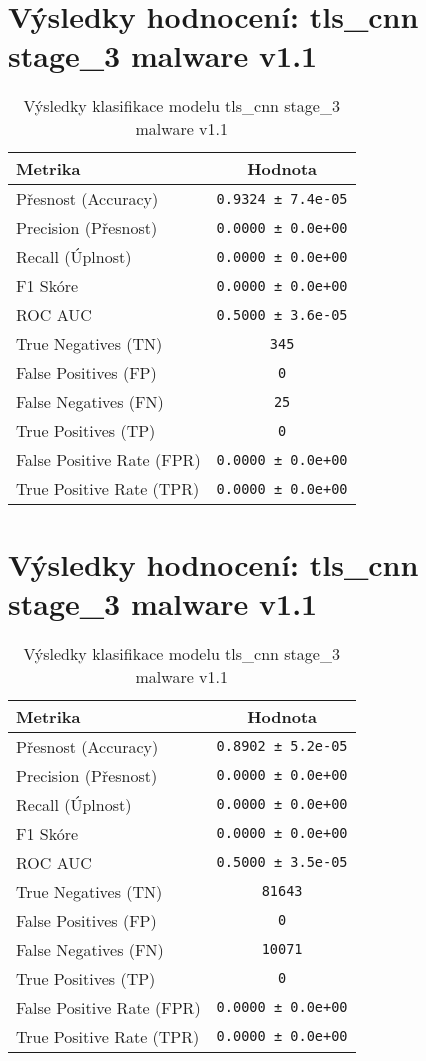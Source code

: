 \section*{Výsledky hodnocení: tls_cnn stage_3 malware v1.1}
\begin{table}[h!]
\centering
\begin{tabular}{|l|c|}
\hline
\textbf{Metrika} & \textbf{Hodnota} \\
\hline
Přesnost (Accuracy) & \texttt{0.9324 ± 7.4e-05} \\
Precision (Přesnost) & \texttt{0.0000 ± 0.0e+00} \\
Recall (Úplnost) & \texttt{0.0000 ± 0.0e+00} \\
F1 Skóre & \texttt{0.0000 ± 0.0e+00} \\
ROC AUC & \texttt{0.5000 ± 3.6e-05} \\
True Negatives (TN) & \texttt{345} \\
False Positives (FP) & \texttt{0} \\
False Negatives (FN) & \texttt{25} \\
True Positives (TP) & \texttt{0} \\
False Positive Rate (FPR) & \texttt{0.0000 ± 0.0e+00} \\
True Positive Rate (TPR) & \texttt{0.0000 ± 0.0e+00} \\
\hline
\end{tabular}
\caption{Výsledky klasifikace modelu tls_cnn stage_3 malware v1.1}
\label{tab:malware_tls_cnn}
\end{table}

\section*{Výsledky hodnocení: tls_cnn stage_3 malware v1.1}
\begin{table}[h!]
\centering
\begin{tabular}{|l|c|}
\hline
\textbf{Metrika} & \textbf{Hodnota} \\
\hline
Přesnost (Accuracy) & \texttt{0.8902 ± 5.2e-05} \\
Precision (Přesnost) & \texttt{0.0000 ± 0.0e+00} \\
Recall (Úplnost) & \texttt{0.0000 ± 0.0e+00} \\
F1 Skóre & \texttt{0.0000 ± 0.0e+00} \\
ROC AUC & \texttt{0.5000 ± 3.5e-05} \\
True Negatives (TN) & \texttt{81643} \\
False Positives (FP) & \texttt{0} \\
False Negatives (FN) & \texttt{10071} \\
True Positives (TP) & \texttt{0} \\
False Positive Rate (FPR) & \texttt{0.0000 ± 0.0e+00} \\
True Positive Rate (TPR) & \texttt{0.0000 ± 0.0e+00} \\
\hline
\end{tabular}
\caption{Výsledky klasifikace modelu tls_cnn stage_3 malware v1.1}
\label{tab:malware_tls_cnn}
\end{table}

